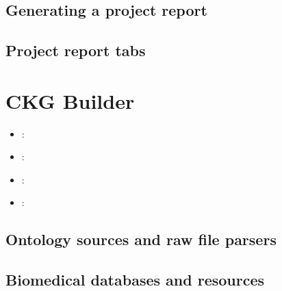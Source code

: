 \documentclass[letterpaper,10pt,english]{sphinxmanual}
\begin{document}
\section{Generating a project report}
\label{\detokenize{project_report/project-report:generating-a-project-report}}\label{\detokenize{project_report/project-report::doc}}

\section{Project report tabs}
\label{\detokenize{project_report/project-tabs:project-report-tabs}}\label{\detokenize{project_report/project-tabs::doc}}

\chapter{CKG Builder}
\label{\detokenize{index:ckg-builder}}\begin{itemize}
\item {} 
:
{\hyperref[\detokenize{ckg_builder/ontologies::doc}]{}}

\item {} 
:
{\hyperref[\detokenize{ckg_builder/databases::doc}]{}}

\item {} 
:
{\hyperref[\detokenize{ckg_builder/experiments::doc}]{}}

\item {} 
:
{\hyperref[\detokenize{ckg_builder/graphdb-builder::doc}]{}}

\end{itemize}


\section{Ontology sources and raw file parsers}
\label{\detokenize{ckg_builder/ontologies:ontology-sources-and-raw-file-parsers}}\label{\detokenize{ckg_builder/ontologies::doc}}

\section{Biomedical databases and resources}
\label{\detokenize{ckg_builder/databases:biomedical-databases-and-resources}}\label{\detokenize{ckg_builder/databases::doc}}
\end{document}
